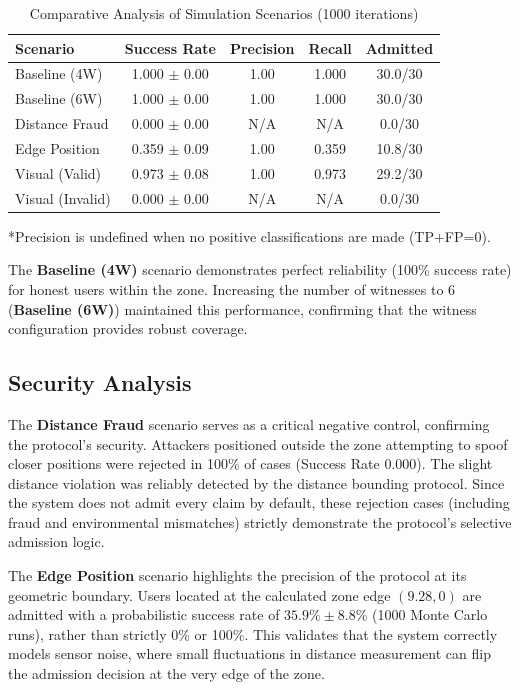 \begin{table}[t]
    \centering
    \caption{Comparative Analysis of Simulation Scenarios (1000 iterations)}
    \label{tab:scenario_comparison}
    \begin{tabular}{lcccc}
        \toprule
        \textbf{Scenario} & \textbf{Success Rate} & \textbf{Precision} & \textbf{Recall} & \textbf{Admitted} \\
        \midrule
        Baseline (4W)      & 1.000 $\pm$ 0.00 & 1.00 & 1.000 & 30.0/30 \\
        Baseline (6W)      & 1.000 $\pm$ 0.00 & 1.00 & 1.000 & 30.0/30 \\
        Distance Fraud     & 0.000 $\pm$ 0.00 & N/A & N/A   & 0.0/30  \\
        Edge Position      & 0.359 $\pm$ 0.09 & 1.00 & 0.359 & 10.8/30 \\
        \midrule
        Visual (Valid)     & 0.973 $\pm$ 0.08 & 1.00 & 0.973 & 29.2/30 \\
        Visual (Invalid)   & 0.000 $\pm$ 0.00 & N/A & N/A & 0.0/30 \\
        \bottomrule
    \end{tabular}
    \footnotesize{*Precision is undefined when no positive classifications are made (TP+FP=0).}
\end{table}

The \textbf{Baseline (4W)} scenario demonstrates perfect reliability (100\% success rate) for honest users within the zone. Increasing the number of witnesses to 6 (\textbf{Baseline (6W)}) maintained this performance, confirming that the witness configuration provides robust coverage.

\subsection{Security Analysis}

The \textbf{Distance Fraud} scenario serves as a critical negative control, confirming the protocol's security. Attackers positioned outside the zone attempting to spoof closer positions were rejected in 100\% of cases (Success Rate 0.000). The slight distance violation was reliably detected by the distance bounding protocol. Since the system does not admit every claim by default, these rejection cases (including fraud and environmental mismatches) strictly demonstrate the protocol's selective admission logic.

The \textbf{Edge Position} scenario highlights the precision of the protocol at its geometric boundary. Users located at the calculated zone edge $(9.28, 0)$ are admitted with a probabilistic success rate of $35.9\% \pm 8.8\%$ (1000 Monte Carlo runs), rather than strictly 0\% or 100\%. This validates that the system correctly models sensor noise, where small fluctuations in distance measurement can flip the admission decision at the very edge of the zone.

